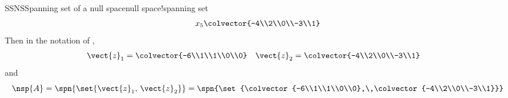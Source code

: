 \begin{example}{SSNS}{Spanning set of a null space}{null space!spanning set}
\begin{equation*}
x_5\colvector{-4\\2\\0\\-3\\1}
\end{equation*}
%
Then in the notation of ,
%
\begin{align*}
\vect{z}_1&=\colvector{-6\\1\\1\\0\\0}&
\vect{z}_2&=\colvector{-4\\2\\0\\-3\\1}
\end{align*}
%
and
%
\begin{equation*}
\nsp{A}
=\spn{\set{\vect{z}_1,\,\vect{z}_2}}
=\spn{\set{\colvector{-6\\1\\1\\0\\0},\,\colvector{-4\\2\\0\\-3\\1}}}
\end{equation*}
%
\end{example}
%
%

